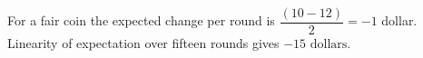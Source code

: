 For a fair coin the expected change per round is $\dfrac{(10-12)}{2}=-1$ dollar. Linearity of expectation over fifteen rounds gives $\boxed{-15\text{ dollars}}$.
